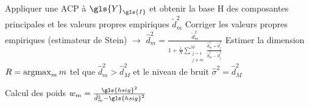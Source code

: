     \begin{normalalgorithme*}
        \begin{minipage}{\textwidth}
            \begin{algorithm}[H]
                
                \medskip
                Appliquer une ACP à $\gls{Y}_{\gls{I}}$ et obtenir la base \gls{H} des composantes principales et les valeurs propres empiriques $\tilde{d}_m^2$\;
                Corriger les valeurs propres empiriques (estimateur de Stein) $\rightarrow$ $\hat{d}_m^2 = \frac{\tilde{d}^2_m}{1+ \frac{1}{N}\sum_{\substack{j=1\\j\neq m }}^M \frac{\tilde{d}^2_m+\tilde{d}^2_j}{\tilde{d}^2_m-\tilde{d}^2_j}}$\;
                Estimer la dimension $R = \argmax_m {m}$ tel que $\hat{d}_m^2 > \hat{d}_M^2$ et le niveau de bruit $\hat{\sigma}^2 = \hat{d}_M^2$\;

                Calcul des poids $w_m = \frac{\gls{hsig}^2}{\hat{d}_m^2 - \gls{hsig}^2}$\;

                \medskip


                \medskip

\end{algorithm}
\end{minipage}
\end{normalalgorithme*}
